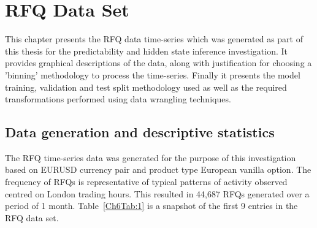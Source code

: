 \chapter{RFQ Data Set} \label{Ch3:title}
\begin{singlespacing}
\begin{microabstract}
   This chapter presents the RFQ data time-series which was generated as part of this thesis for the predictability and hidden state inference investigation. It provides graphical descriptions of the data, along with justification for choosing a 'binning' methodology to process the time-series. Finally it presents the model training, validation and test split methodology used as well as the required transformations performed using data wrangling techniques.
\end{microabstract}
\end{singlespacing}


\section{Data generation and descriptive statistics}

The RFQ time-series data was generated for the purpose of this investigation based on EURUSD currency pair and product type European vanilla option. The frequency of RFQs is representative of typical patterns of activity observed centred on London trading hours. This resulted in 44,687 RFQs generated over a period of 1 month. Table~\ref{Ch6Tab:1} is a snapshot of the first 9 entries in the RFQ data set.

